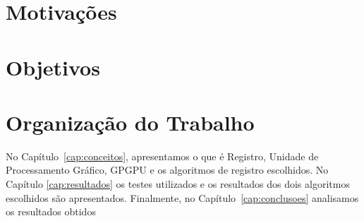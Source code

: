 \section{Motivações}

\section{Objetivos}

\section{Organização do Trabalho}
\label{sec:organizacao_trabalho}

No Capítulo~\ref{cap:conceitos}, apresentamos o que é Registro, Unidade de Processamento Gráfico, GPGPU e os algoritmos 
de registro escolhidos. No Capítulo \ref{cap:resultados} os testes utilizados e os resultados dos dois algoritmos 
escolhidos são apresentados. Finalmente, no Capítulo~\ref{cap:conclusoes} analisamos os resultados obtidos 